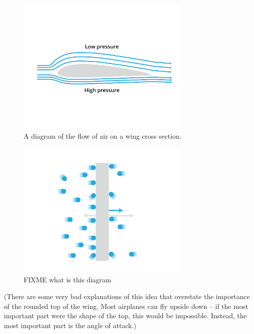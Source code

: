 \begin{figure}[htbp]
    \centering
    \includegraphics[width=0.75\textwidth]{airfoil.png}
    \caption{A diagram of the flow of air on a wing cross section.}
    \label{fig:airfoil}
\end{figure}
    

\begin{figure}[htbp]
    \centering
    \includegraphics[width=0.75\textwidth]{pressureMicro.png}
    \caption{FIXME what is this diagram}
    \label{fig:pressureMicro}
\end{figure}
    

(There are some very bad explanations of this idea that overstate the importance of the rounded top of the wing.   Most airplanes can fly upside down -- if the 
most important part were the shape of the top,  this would be impossible. Instead, the most important part is the angle of attack.)


